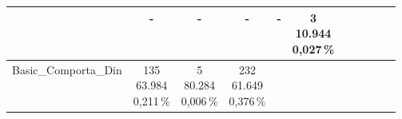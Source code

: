 \begin{table}[H]
{\begin{tabular}{lcccccccccc}
			                     & \shortstack{-                                                                                                                                                             \\ \,\\ \, }
			                     & \shortstack{-                                                                                                                                                             \\ \,\\ \, }
			                     & \shortstack{-                                                                                                                                                             \\ \,\\ \, }
			                     & \shortstack{-                                                                                                                                                             \\ \,\\ \, }
			                     & \shortstack{ 3                                                                                                                                                            \\10.944\\0,027\,\% } \\
			\midrule
			\shortstack{Basic\_Comporta\_Din                                                                                                                                                                 \\  \, \\ \, }
			                     & \shortstack{135                                                                                                                                                           \\ 63.984 \\ 0,211\,\%}
			                     & \shortstack{5                                                                                                                                                             \\ 80.284 \\ 0,006\,\%}
			                     & \shortstack{232                                                                                                                                                           \\ 61.649 \\ 0,376\,\%}

\end{tabular}}
\end{table}
